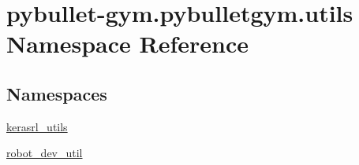 \hypertarget{namespacepybullet-gym_1_1pybulletgym_1_1utils}{}\section{pybullet-\/gym.pybulletgym.\+utils Namespace Reference}
\label{namespacepybullet-gym_1_1pybulletgym_1_1utils}
\subsection*{Namespaces}
\begin{DoxyCompactItemize}
\item 
 \hyperlink{namespacepybullet-gym_1_1pybulletgym_1_1utils_1_1kerasrl__utils}{kerasrl\+\_\+utils}
\item 
 \hyperlink{namespacepybullet-gym_1_1pybulletgym_1_1utils_1_1robot__dev__util}{robot\+\_\+dev\+\_\+util}
\end{DoxyCompactItemize}
